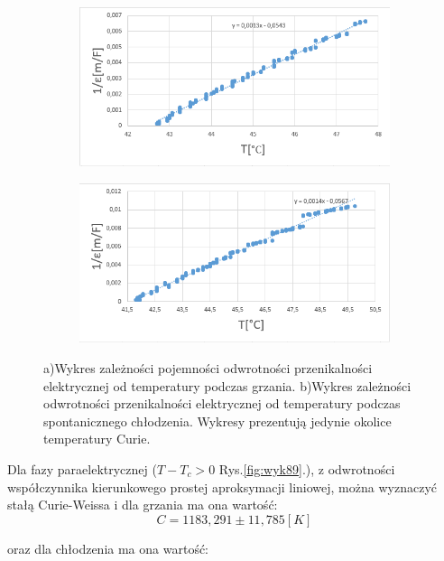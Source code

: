 \documentclass{article}
\begin{document}
\begin{figure}[h!]
  \centering
  \begin{subfigure}[b]{0.49\linewidth}
    \includegraphics[width=\linewidth]{wyk6.png}
    \caption{}
  \end{subfigure}
  \begin{subfigure}[b]{0.49\linewidth}
    \includegraphics[width=\linewidth]{wyk7.png}
    \caption{}
  \end{subfigure}
  \caption{a)Wykres zależności pojemności odwrotności przenikalności elektrycznej od temperatury podczas grzania. b)Wykres zależności odwrotności przenikalności elektrycznej od temperatury podczas spontanicznego chłodzenia. Wykresy prezentują jedynie okolice temperatury Curie.}
\label{fig:wyk67}
\end{figure}

Dla fazy paraelektrycznej ($T-T_{c} > 0$ Rys.\ref{fig:wyk89}.), z odwrotności współczynnika kierunkowego prostej aproksymacji liniowej, można wyznaczyć stałą Curie-Weissa i dla grzania ma ona wartość:
\begin{equation}
C=1183,291 \pm 11,785 [K]
\end{equation}

oraz dla chłodzenia ma ona wartość:
\end{document}
